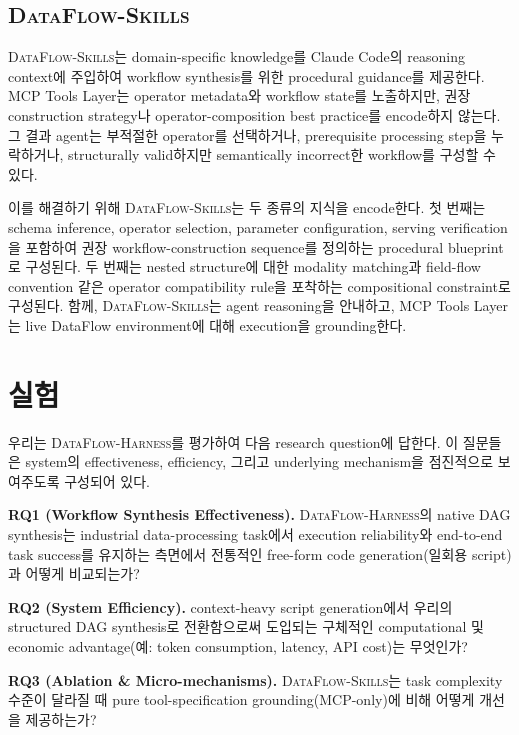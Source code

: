 \subsection{\textsc{DataFlow-Skills}}
\label{sec:skills}

\textsc{DataFlow-Skills}는 domain-specific knowledge를 Claude Code의 reasoning context에 주입하여 workflow synthesis를 위한 procedural guidance를 제공한다. MCP Tools Layer는 operator metadata와 workflow state를 노출하지만, 권장 construction strategy나 operator-composition best practice를 encode하지 않는다. 그 결과 agent는 부적절한 operator를 선택하거나, prerequisite processing step을 누락하거나, structurally valid하지만 semantically incorrect한 workflow를 구성할 수 있다.

이를 해결하기 위해 \textsc{DataFlow-Skills}는 두 종류의 지식을 encode한다. 첫 번째는 schema inference, operator selection, parameter configuration, serving verification을 포함하여 권장 workflow-construction sequence를 정의하는 procedural blueprint로 구성된다. 두 번째는 nested structure에 대한 modality matching과 field-flow convention 같은 operator compatibility rule을 포착하는 compositional constraint로 구성된다. 함께, \textsc{DataFlow-Skills}는 agent reasoning을 안내하고, MCP Tools Layer는 live DataFlow environment에 대해 execution을 grounding한다.

\section{실험}
\label{sec:eval}

우리는 \textsc{DataFlow-Harness}를 평가하여 다음 research question에 답한다. 이 질문들은 system의 effectiveness, efficiency, 그리고 underlying mechanism을 점진적으로 보여주도록 구성되어 있다.

\textbf{RQ1 (Workflow Synthesis Effectiveness).} 
\textsc{DataFlow-Harness}의 native DAG synthesis는 industrial data-processing task에서 execution reliability와 end-to-end task success를 유지하는 측면에서 전통적인 free-form code generation(일회용 script)과 어떻게 비교되는가?

\textbf{RQ2 (System Efficiency).} 
context-heavy script generation에서 우리의 structured DAG synthesis로 전환함으로써 도입되는 구체적인 computational 및 economic advantage(예: token consumption, latency, API cost)는 무엇인가?

\textbf{RQ3 (Ablation \& Micro-mechanisms).}
\textsc{DataFlow-Skills}는 task complexity 수준이 달라질 때 pure tool-specification grounding(MCP-only)에 비해 어떻게 개선을 제공하는가?

